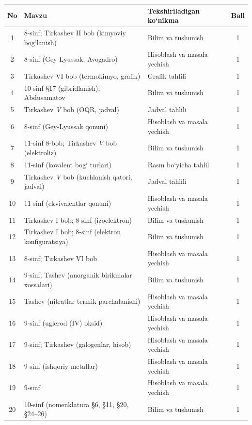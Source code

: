 \documentclass[11pt,a4paper]{article}
\begin{document}
{\small\noindent\begin{longtable}{|c|p{7.2cm}|p{5.4cm}|c|}\hline \textbf{No} & \textbf{Mavzu} & \textbf{Tekshiriladigan ko`nikma} & \textbf{Ball}\\\hline
1 & 8-sinf; Tirkashev II bob (kimyoviy bog`lanish) & Bilim va tushunish & 1\\\hline
2 & 8-sinf (Gey-Lyussak, Avogadro) & Hisoblash va masala yechish & 1\\\hline
3 & Tirkashev VI bob (termokimyo, grafik) & Grafik tahlili & 1\\\hline
4 & 10-sinf \S{}17 (gibridlanish); Abdusamatov & Bilim va tushunish & 1\\\hline
5 & Tirkashev \textit{V} bob (OQR, jadval) & Jadval tahlili & 1\\\hline
6 & 8-sinf (Gey-Lyussak qonuni) & Hisoblash va masala yechish & 1\\\hline
7 & 11-sinf 8-bob; Tirkashev \textit{V} bob (elektroliz) & Bilim va tushunish & 1\\\hline
8 & 11-sinf (kovalent bog` turlari) & Rasm bo`yicha tahlil & 1\\\hline
9 & Tirkashev \textit{V} bob (kuchlanish qatori, jadval) & Jadval tahlili & 1\\\hline
10 & 11-sinf (ekvivalentlar qonuni) & Hisoblash va masala yechish & 1\\\hline
11 & Tirkashev I bob; 8-sinf (izoelektron) & Bilim va tushunish & 1\\\hline
12 & Tirkashev I bob; 8-sinf (elektron konfiguratsiya) & Bilim va tushunish & 1\\\hline
13 & 8-sinf; Tirkashev VI bob & Hisoblash va masala yechish & 1\\\hline
14 & 9-sinf; Tashev (anorganik birikmalar xossalari) & Bilim va tushunish & 1\\\hline
15 & Tashev (nitratlar termik parchalanishi) & Hisoblash va masala yechish & 1\\\hline
16 & 9-sinf (uglerod (IV) oksid) & Hisoblash va masala yechish & 1\\\hline
17 & 9-sinf; Tirkashev (galogenlar, hisob) & Hisoblash va masala yechish & 1\\\hline
18 & 9-sinf (ishqoriy metallar) & Hisoblash va masala yechish & 1\\\hline
19 & 9-sinf & Hisoblash va masala yechish & 1\\\hline
20 & 10-sinf (nomenklatura \S{}6, \S{}11, \S{}20, \S{}24--26) & Bilim va tushunish & 1\\\hline

\end{longtable}}
\end{document}
